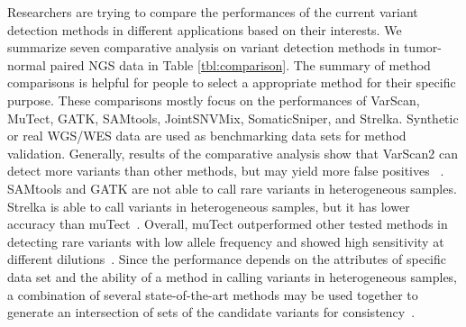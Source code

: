 \documentclass[a4,center,fleqn]{NAR}
\begin{document}
Researchers are trying to compare the performances of the current variant detection methods in different applications based on their interests.
We summarize seven comparative analysis on variant detection methods in tumor-normal paired NGS data in Table \ref{tbl:comparison}.
The summary of method comparisons is helpful for people to select a appropriate method for their specific purpose.
These comparisons mostly focus on the performances of VarScan, MuTect, GATK, SAMtools, JointSNVMix, SomaticSniper, and Strelka.
Synthetic or real WGS/WES data are used as benchmarking data sets for method validation.
Generally, results of the comparative analysis show that VarScan2 can detect more variants than other methods, but may yield more false positives~\citep{wang2013detecting, Spencer2014} .
SAMtools and GATK are not able to call rare variants in heterogeneous samples.
Strelka is able to call variants in heterogeneous samples, but it has lower accuracy than muTect~\citep{wang2013detecting}.
Overall, muTect outperformed other tested methods in detecting rare variants with low allele frequency and showed high sensitivity at different dilutions~\citep{wang2013detecting, Xu2014}.
Since the performance depends on the attributes of specific data set and the ability of a method in calling variants in heterogeneous samples, a combination of several state-of-the-art methods may be used together to generate an intersection of sets of the candidate variants for consistency~\citep{liu2013variant}.
\end{document}
